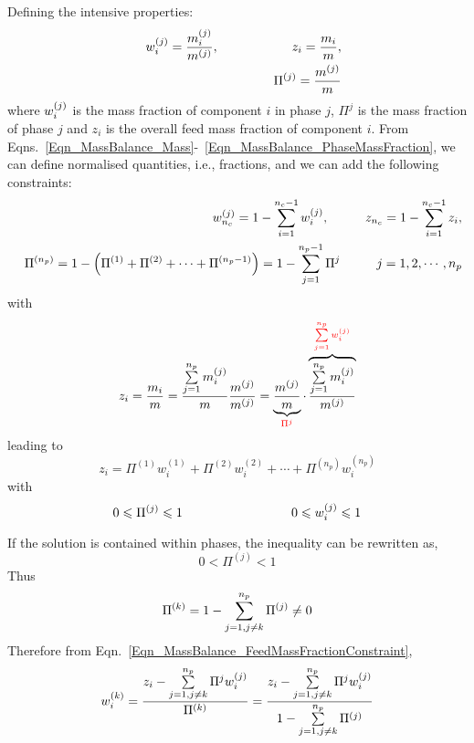 Defining the intensive properties:
\begin{eqnarray}
&& \mfr[w]{i}{j} = \frc{\mfr[m]{i}{j}}{m^{(j)}}, \hspace{2cm} z_{i} = \frc{m_{i}}{m},\label{Eqn_MassBalance_MassFraction} \\
&& \Pi^{(j)} = \frc{m^{(j)}}{m}\label{Eqn_MassBalance_PhaseMassFraction} 
\end{eqnarray}
where $\mfr[w]{i}{j}$ is the mass fraction of component $i$ in phase $j$, $\Pi^{j}$ is the mass fraction of phase $j$ and $z_{i}$ is the overall feed mass fraction of component $i$. From Eqns.~\ref{Eqn_MassBalance_Mass}-~\ref{Eqn_MassBalance_PhaseMassFraction}, we can define normalised quantities, i.e., fractions, and we can add the following constraints:
\begin{eqnarray}
&&\mfr[w]{n_{c}}{j} = 1 - \summation_{i=1}^{n_{c}-1}\mfr[w]{i}{j},\hspace{1cm}  z_{n_{c}} = 1 - \summation_{i=1}^{n_{c}-1}z_{i},  \label{Eqn_MassBalance_MassFraction2} \\
&&\Pi^{\left(n_{p}\right)} = 1 - \left(\Pi^{(1)} + \Pi^{(2)} + \cdots + \Pi^{\left(n_{p}-1\right)}\right) = 1 - \summation_{j=1}^{n_{p}-1} \Pi^{j}\hspace{1cm} j=1,2,\cdots,n_{p} \label{Eqn_MassBalance_PhaseMassFraction2}
\end{eqnarray} 
with
\begin{displaymath}
  z_{i} = \frc{m_{i}}{m} = \frc{\summation_{j=1}^{n_{p}}\mfr[m]{i}{j}}{m} \frc{m^{(j)}}{m^{(j)}} = \underbrace{\frc{m^{(j)}}{m}}_{\red{\Pi^{j}}} \cdot \overbrace{\frc{\summation_{j=1}^{n_{p}}\mfr[m]{i}{j}}{m^{(j)}}}^{\red{\summation_{j=1}^{n_{p}}\mfr[w]{i}{j}}} 
\end{displaymath}
leading to
\begin{equation}
z_{i} = \Pi^{(1)}w_{i}^{(1)} + \Pi^{(2)}w_{i}^{(2)} + \cdots + \Pi^{\left(n_{p}\right)}w_{i}^{\left(n_{p}\right)}
\label{Eqn_MassBalance_FeedMassFractionConstraint}
\end{equation}
with
\begin{equation}
0\leq\Pi^{(j)}\leq 1 \hspace{3cm} 0\leq \mfr[w]{i}{j}\leq 1
\end{equation}

If the solution is contained within  phases, the inequality can be rewritten as,
\begin{equation} 
0 < \Pi^{(j)} < 1
\end{equation}
Thus
\begin{displaymath}
\Pi^{(k)} = 1 - \summation_{j=1,j\neq k}^{n_{p}} \Pi^{(j)} \neq 0
\end{displaymath}
Therefore from Eqn.~\ref{Eqn_MassBalance_FeedMassFractionConstraint},
\begin{equation}
w_{i}^{(k)} = \frc{z_{i}-\summation_{j=1,j\neq k}^{n_{p}}\Pi^{j}\mfr[w]{i}{j}}{\Pi^{(k)}} = \frc{z_{i} - \summation_{j=1,j\neq k}^{n_{p}}\Pi^{j}\mfr[w]{i}{j}}{1-\summation_{j=1,j\neq k}^{n_{p}}\Pi^{(j)}}
\label{Eqn_MassBalance_FeedMassFractionConstraint2}
\end{equation}


